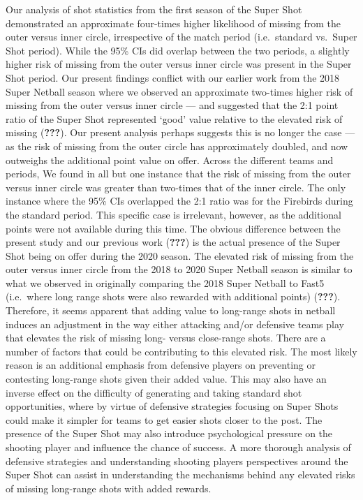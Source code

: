 \documentclass[]{elsarticle} %
\begin{document}
Our analysis of shot statistics from the first season of the Super Shot
demonstrated an approximate four-times higher likelihood of missing from
the outer versus inner circle, irrespective of the match period
(i.e.~standard vs.~Super Shot period). While the 95\% CIs did overlap
between the two periods, a slightly higher risk of missing from the
outer versus inner circle was present in the Super Shot period. Our
present findings conflict with our earlier work from the 2018 Super
Netball season where we observed an approximate two-times higher risk of
missing from the outer versus inner circle --- and suggested that the
2:1 point ratio of the Super Shot represented `good' value relative to
the elevated risk of missing ({\textbf{???}}). Our present analysis
perhaps suggests this is no longer the case --- as the risk of missing
from the outer circle has approximately doubled, and now outweighs the
additional point value on offer. Across the different teams and periods,
We found in all but one instance that the risk of missing from the outer
versus inner circle was greater than two-times that of the inner circle.
The only instance where the 95\% CIs overlapped the 2:1 ratio was for
the Firebirds during the standard period. This specific case is
irrelevant, however, as the additional points were not available during
this time. The obvious difference between the present study and our
previous work ({\textbf{???}}) is the actual presence of the Super Shot
being on offer during the 2020 season. The elevated risk of missing from
the outer versus inner circle from the 2018 to 2020 Super Netball season
is similar to what we observed in originally comparing the 2018 Super
Netball to Fast5 (i.e.~where long range shots were also rewarded with
additional points) ({\textbf{???}}). Therefore, it seems apparent that
adding value to long-range shots in netball induces an adjustment in the
way either attacking and/or defensive teams play that elevates the risk
of missing long- versus close-range shots. There are a number of factors
that could be contributing to this elevated risk. The most likely reason
is an additional emphasis from defensive players on preventing or
contesting long-range shots given their added value. This may also have
an inverse effect on the difficulty of generating and taking standard
shot opportunities, where by virtue of defensive strategies focusing on
Super Shots could make it simpler for teams to get easier shots closer
to the post. The presence of the Super Shot may also introduce
psychological pressure on the shooting player and influence the chance
of success. A more thorough analysis of defensive strategies and
understanding shooting players perspectives around the Super Shot can
assist in understanding the mechanisms behind any elevated risks of
missing long-range shots with added rewards.
\end{document}
